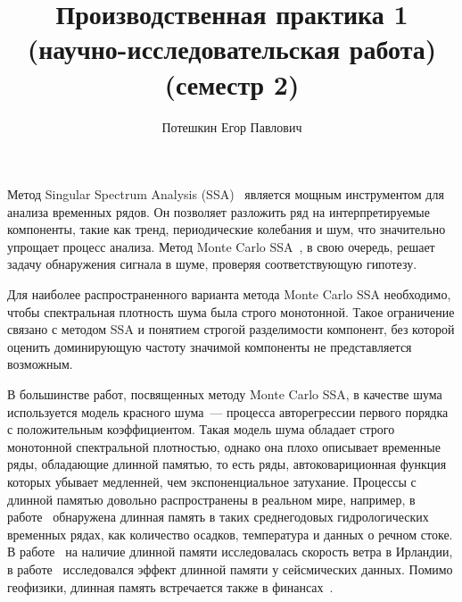 \documentclass[specialist,
substylefile = spbu_report.rtx,
subf,href,colorlinks=true, 12pt]{disser}
\theoremstyle{definition}
\begin{document}
%
%

\title{Производственная практика 1 (научно-исследовательская работа) (семестр 2)}


\author{Потешкин Егор Павлович}


\date{\number\year}

\maketitle

\tableofcontents

\intro
Метод Singular Spectrum Analysis (SSA)~\cite{Broomhead1986,Golyandina2001} является мощным инструментом для анализа временных рядов. Он позволяет разложить ряд на интерпретируемые компоненты, такие как тренд, периодические колебания и шум, что значительно упрощает процесс анализа. Метод Monte Carlo SSA~\cite{Allen1996}, в свою очередь, решает задачу обнаружения сигнала в шуме, проверяя соответствующую гипотезу.

Для наиболее распространенного варианта метода Monte Carlo SSA необходимо, чтобы спектральная плотность шума была строго монотонной. Такое ограничение связано с методом SSA и понятием строгой разделимости компонент, без которой оценить доминирующую частоту значимой компоненты не представляется возможным.

В большинстве работ, посвященных методу Monte Carlo SSA, в качестве шума используется модель красного шума~--- процесса авторегрессии первого порядка с положительным коэффициентом. Такая модель шума обладает строго монотонной спектральной плотностью, однако она плохо описывает временные ряды, обладающие длинной памятью, то есть ряды, автоковариционная функция которых убывает медленней, чем экспоненциальное затухание. Процессы с длинной памятью довольно распространены в реальном мире, например, в работе~\cite{Hipel1994} обнаружена длинная память в таких среднегодовых гидрологических временных рядах, как количество осадков, температура и данных о речном стоке. В работе~\cite{Haslett1989} на наличие длинной памяти исследовалась скорость ветра в Ирландии, в работе~\cite{Mariani2020} исследовался эффект длинной памяти у сейсмических данных. Помимо геофизики, длинная память встречается также в финансах~\cite{Barkoulas1997,Guglielmo2019}.
\end{document}
